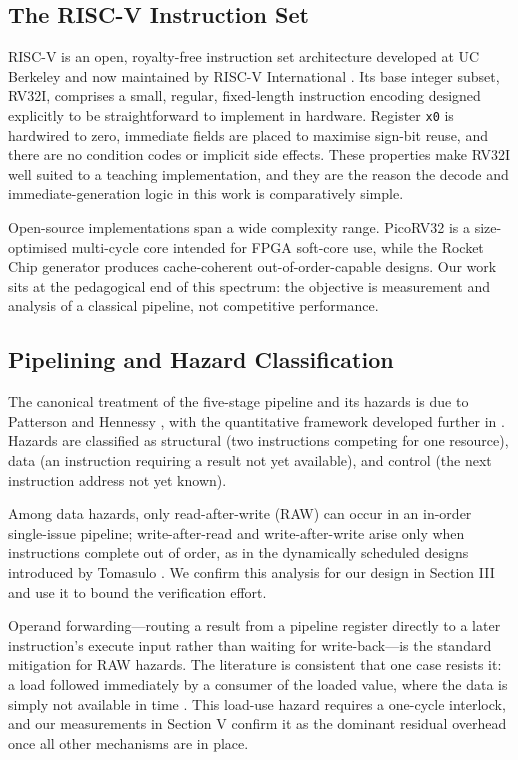 \documentclass[conference]{IEEEtran}
\begin{document}
\subsection{The RISC-V Instruction Set}

RISC-V is an open, royalty-free instruction set architecture developed at
UC Berkeley and now maintained by RISC-V International
\cite{riscvisa}. Its base integer subset, RV32I, comprises a small,
regular, fixed-length instruction encoding designed explicitly to be
straightforward to implement in hardware. Register \texttt{x0} is
hardwired to zero, immediate fields are placed to maximise sign-bit
reuse, and there are no condition codes or implicit side effects. These
properties make RV32I well suited to a teaching implementation, and they
are the reason the decode and immediate-generation logic in this work is
comparatively simple.

Open-source implementations span a wide complexity range. PicoRV32
\cite{picorv32} is a size-optimised multi-cycle core intended for FPGA
soft-core use, while the Rocket Chip generator \cite{rocketchip} produces
cache-coherent out-of-order-capable designs. Our work sits at the
pedagogical end of this spectrum: the objective is measurement and
analysis of a classical pipeline, not competitive performance.

\subsection{Pipelining and Hazard Classification}

The canonical treatment of the five-stage pipeline and its hazards is due
to Patterson and Hennessy \cite{patterson2020}, with the quantitative
framework developed further in \cite{hennessy2017}. Hazards are classified
as structural (two instructions competing for one resource), data (an
instruction requiring a result not yet available), and control (the next
instruction address not yet known).

Among data hazards, only read-after-write (RAW) can occur in an in-order
single-issue pipeline; write-after-read and write-after-write arise only
when instructions complete out of order, as in the dynamically scheduled
designs introduced by Tomasulo \cite{tomasulo1967}. We confirm this
analysis for our design in Section III and use it to bound the
verification effort.

Operand forwarding---routing a result from a pipeline register directly to
a later instruction's execute input rather than waiting for write-back---is
the standard mitigation for RAW hazards. The literature is consistent that
one case resists it: a load followed immediately by a consumer of the
loaded value, where the data is simply not available in time
\cite{patterson2020}. This load-use hazard requires a one-cycle
interlock, and our measurements in Section V confirm it as the dominant
residual overhead once all other mechanisms are in place.
\end{document}
